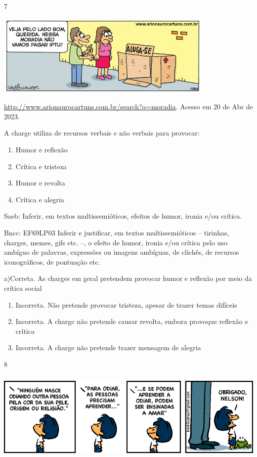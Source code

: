 {{\begin{itemize}
\begin{itemize}
\num{7}

\includegraphics[width=4.16667in,height=1.57292in]{./imgSAEB_7_POR/media/image17.png}

\href{http://www.arionaurocartuns.com.br/search?q=moradia}{\uline{http://www.arionaurocartuns.com.br/search?q=moradia}}.
Acesso em 20 de Abr de 2023.

A charge utiliza de recursos verbais e não verbais para provocar:

\begin{enumerate}
\def\labelenumi{\alph{enumi})}
\item
  Humor e reflexão
\item
  Crítica e tristeza
\item
  Humor e revolta
\item
  Crítica e alegria
\end{enumerate}

Saeb: Inferir, em textos multissemióticos, efeitos de humor, ironia e/ou
crítica.

Bncc: EF69LP03 Inferir e justificar, em textos multissemióticos --
tirinhas, charges, memes, gifs etc. --, o efeito de humor, ironia e/ou
crítica pelo uso ambíguo de palavras, expressões ou imagens ambíguas, de
clichês, de recursos iconográficos, de pontuação etc.

a)Correta. As charges em geral pretendem provocar humor e reflexão por
meio da crítica social

\begin{enumerate}
\def\labelenumi{\arabic{enumi}.}
\item
  Incorreta. Não pretende provocar tristeza, apesar de trazer temas
  difíceis
\item
  Incorreta. A charge não pretende causar revolta, embora provoque
  reflexão e crítica
\item
  Incorreta. A charge não pretende trazer mensagem de alegria
\end{enumerate}

\num{8}

\includegraphics[width=5.90551in,height=1.72222in]{./imgSAEB_7_POR/media/image18.png}


\end{itemize}
\end{itemize}}}
